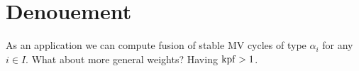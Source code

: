 \documentclass[draft]{article}
\begin{document}
\begin{comment}
\begin{lemma}%
    Let $\mu',\mu''$ be dominant and let $s\in \AA^1 - \{0\}$. Then 
    \begin{equation}
        S_{\mu',\mu''}^s \subset \cW_\mu 
    \end{equation}
    where $\mu = \mu_1 + \mu_2$.
\end{lemma}

\begin{proof}
    We have
\[
\begin{split}
    S_{\mu_1, \mu_2} & = N\xT[t^{-1}]t^{\mu_1}(t-s)^{\mu_2} \\
     & \subset T_1\xt[t^{-1}] N\xT[t^{-1}] t^{\mu_1} (t-s)^{\mu_2} \\
     & = T_1\xt[t^{-1}] N_1\xt[t^{-1}] t^{\mu_1} (t-s)^{\mu_2} \qquad \text{\cite[Lemma 2.3]{kamnitzer2014yangians}}\\
     & = B_1\xt[t^{-1}] t^{\mu_1} (t-s)^{\mu_2} \\
     & = B_1\xt[t^{-1}] t^{\mu_1 + \mu_2} \\
     & \subset G_1\xt[t^{-1}] t^{\mu_1 + \mu_2} \\
     & = W_{\mu_1 + \mu_2}
\end{split}
\]
where $B_1\xt[t^{-1}] t^{\mu_1} (t-s)^{\mu_2} = B_1\xt[t^{-1}] t^{\mu_1 + \mu_2}$ since 
\[
\frac{t}{t-s} = 
1 + \frac{s}{t} + \frac{s^2}{t^2} + \cdots 
\in B_1\xt[t^{-1}].
\]
\end{proof}
\end{comment}

\section{Denouement}
\label{s:denouement}

As an application we can compute fusion of stable MV cycles of type $\alpha_i$ for any $i \in I$. What about more general weights? Having $\operatorname{kpf} > 1$.
\end{document}
